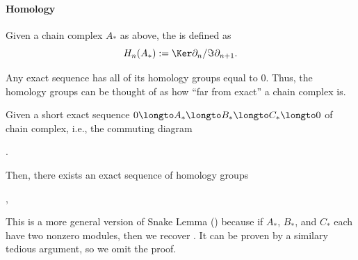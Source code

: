 \paragraph{Homology}
\begin{definition}
    Given a chain complex $A_*$ as above, the  is defined as 
    \[H_n(A_*) := \Ker \partial_n / \Im \partial_{n+1}.\]
\end{definition}
\begin{example}
    Any exact sequence has all of its homology groups equal to $0$. Thus, the homology groups can be thought of as how ``far from exact'' a chain complex is.
\end{example}
\begin{theorem}
    \label{thm:long_exact_homology}
    Given a short exact sequence 
    $0\longto A_*\longto B_*\longto C_*\longto 0$
    of chain complex, i.e., the commuting diagram
\begin{center}
.
\end{center}
Then, there exists an exact sequence of homology groups
\begin{center}
    ,
    \end{center}
\end{theorem}
This is a more general version of Snake Lemma
() because if
$A_*$, $B_*$, and $C_*$ each have two nonzero modules,
then we recover .
It can be proven by a similary tedious argument,
so we omit the proof.
